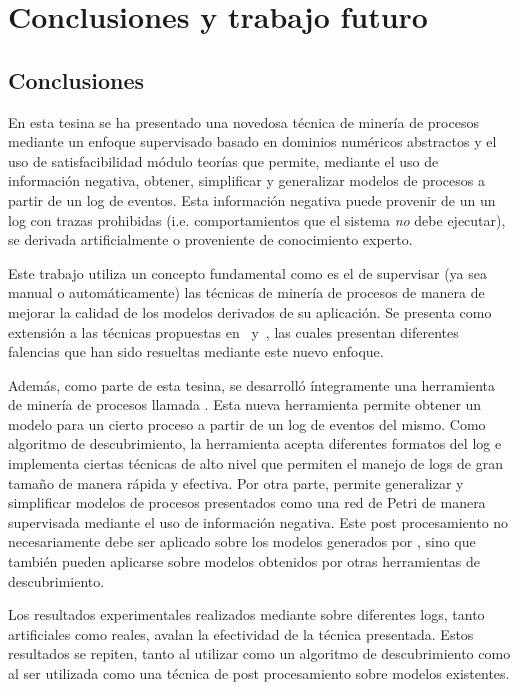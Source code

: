 \chapter{Conclusiones y trabajo futuro}
\label{chap:5}

\section*{Conclusiones}

En esta tesina se ha presentado una novedosa técnica de minería de procesos mediante un enfoque
supervisado basado en dominios numéricos abstractos y el uso de satisfacibilidad 
módulo teorías que permite, mediante el uso de información negativa, obtener, simplificar y
generalizar modelos de procesos a partir de un log de eventos. Esta información negativa puede provenir 
de un un log con trazas prohibidas (i.e. comportamientos que el sistema \emph{no} debe ejecutar),
se derivada artificialmente o proveniente de conocimiento experto.

Este trabajo utiliza un concepto fundamental como es el de supervisar (ya sea manual o automáticamente)
las técnicas de minería de procesos de manera de mejorar la calidad de los modelos derivados de
su aplicación. Se presenta como extensión a las técnicas propuestas en~\cite{CarmonaC14}
y~\cite{LeonCB15}, las cuales presentan diferentes falencias que han sido resueltas mediante
este nuevo enfoque.

Además, como parte de esta tesina, se desarrolló íntegramente una herramienta de
minería de procesos llamada \pachtool.
Esta nueva herramienta%
permite obtener un modelo para un cierto proceso a partir de un log de eventos del mismo.
Como algoritmo de descubrimiento, la herramienta acepta diferentes formatos del log 
e implementa ciertas técnicas de alto nivel que permiten el manejo de logs de gran 
tamaño de manera rápida y efectiva.
Por otra parte, \pachtool permite generalizar y simplificar modelos de procesos presentados como
una red de Petri de manera supervisada mediante el uso de información negativa. Este 
post procesamiento no necesariamente debe ser aplicado sobre los modelos generados por \pachtool,
sino que también pueden aplicarse sobre modelos obtenidos por otras herramientas de descubrimiento.

Los resultados experimentales realizados mediante \pachtool sobre diferentes logs, tanto 
artificiales como reales, avalan la efectividad de la técnica presentada.
Estos resultados se repiten, tanto al utilizar \pachtool como un algoritmo de descubrimiento 
como al ser utilizada como una técnica de post procesamiento sobre modelos existentes.

